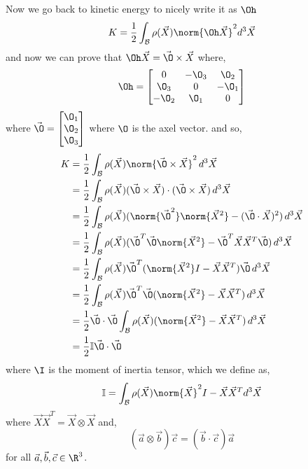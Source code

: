 Now we go back to kinetic energy to nicely write it as $\Oh$
$$ K = \frac{1}{2} \int_\mathcal{B} \rho(\vec X) \norm{\Oh \vec X}^2 d^3\vec X $$
and now we can prove that $\Oh \vec X = \vec \O \times \vec X$
where,
$$ \Oh = \begin{bmatrix}
  0 & -\O_3 & \O_2\\
  \O_3 & 0 & -\O_1\\
  -\O_2 & \O_1 & 0 \\
\end{bmatrix} $$
where $\vec\O = \begin{bmatrix}
  \O_1\\ \O_2\\\O_3
\end{bmatrix}$
where $\O$ is the axel vector.
and so,
\begin{align*}
  K &= \frac{1}{2} \int_\mathcal{B} {\rho (\vec X)\norm{\vec\O \times \vec X}^2 \,d^3\vec X}\\
  &= \frac{1}{2} \int_\mathcal{B} {\rho (\vec X)(\vec\O\times\vec X) \cdot (\vec\O\times\vec X) \,d^3\vec X}\\
  &= \frac{1}{2}\int_\mathcal{B} {\rho (\vec X)(\norm{\vec \O^2}\norm{\vec X^2} - (\vec\O \cdot \vec X)^2) \,d^3\vec X}\\
  &= \frac{1}{2}\int_\mathcal{B} {\rho (\vec X)(\vec\O^T\vec\O\norm{\vec X^2} - \vec\O^T\vec X \vec X^T\vec\O) \,d^3\vec X}\\
  &= \frac{1}{2}\int_\mathcal{B} {\rho (\vec X)\vec\O^T(\norm{\vec X^2}I - \vec X \vec X^T)\vec\O\, d^3\vec X}\\
  &= \frac{1}{2}\int_\mathcal{B} {\rho (\vec X)\vec\O^T\vec\O(\norm{\vec X^2} - \vec X \vec X^T)\, d^3\vec X}\\
  &= \frac{1}{2}\vec\O \cdot \vec\O \int_\mathcal{B} {\rho (\vec X)(\norm{\vec X^2} - \vec X \vec X^T)\, d^3\vec X}\\
  &= \frac{1}{2}\mathbb{I}\vec\O \cdot \vec \O
\end{align*}
where $\I$ is the moment of inertia tensor, which we define as,
$$ \mathbb{I} = \int_\mathcal{B} \rho(\vec X)\norm{\vec X}^2I - \vec X\vec X^T d^3\vec X $$
where $\vec X\vec X^T = \vec X \otimes \vec X$ and,
$$ (\vec a \otimes \vec b)\vec c = (\vec b \cdot \vec c)\vec a $$
for all $\vec a, \vec b, \vec c \in \R^3$.
